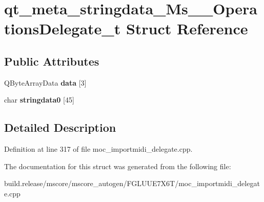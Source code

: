 \hypertarget{structqt__meta__stringdata___ms_____operations_delegate__t}{}\section{qt\+\_\+meta\+\_\+stringdata\+\_\+\+Ms\+\_\+\+\_\+\+Operations\+Delegate\+\_\+t Struct Reference}
\label{structqt__meta__stringdata___ms_____operations_delegate__t}
\subsection*{Public Attributes}
\begin{DoxyCompactItemize}
\item 
\mbox{\label{structqt__meta__stringdata___ms_____operations_delegate__t_ae09c54d2bd56493b89d88d7af97acb6f}} 
Q\+Byte\+Array\+Data {\bfseries data} \mbox{[}3\mbox{]}
\item 
\mbox{\label{structqt__meta__stringdata___ms_____operations_delegate__t_a9e0bf048d4759b84eec79527bc80d8a8}} 
char {\bfseries stringdata0} \mbox{[}45\mbox{]}
\end{DoxyCompactItemize}


\subsection{Detailed Description}


Definition at line 317 of file moc\+\_\+importmidi\+\_\+delegate.\+cpp.



The documentation for this struct was generated from the following file\+:\begin{DoxyCompactItemize}
\item 
build.\+release/mscore/mscore\+\_\+autogen/\+F\+G\+L\+U\+U\+E7\+X6\+T/moc\+\_\+importmidi\+\_\+delegate.\+cpp\end{DoxyCompactItemize}
